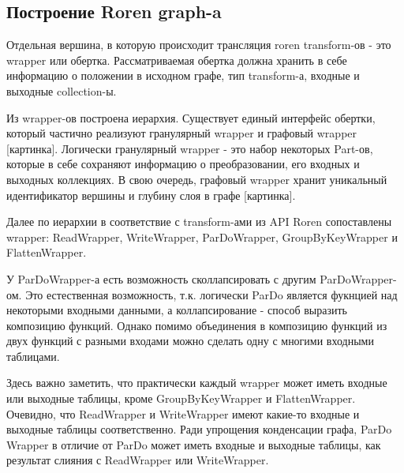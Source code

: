 \subsection{Построение Roren graph-a}

Отдельная вершина, в которую происходит трансляция roren transform-ов - это wrapper или обертка. Рассматриваемая обертка должна хранить в себе информацию о положении в исходном графе, тип transform-а, входные и выходные collection-ы.

Из wrapper-ов построена иерархия. Существует единый интерфейс обертки, который частично реализуют гранулярный wrapper и графовый wrapper [картинка]. Логически гранулярный wrapper - это набор некоторых Part-ов, которые в себе сохраняют информацию о преобразовании, его входных и выходных коллекциях. В свою очередь, графовый wrapper хранит уникальный идентификатор вершины и глубину слоя в графе [картинка].

Далее по иерархии в соответствие с transform-ами из API Roren сопоставлены wrapper: ReadWrapper, WriteWrapper, ParDoWrapper, GroupByKeyWrapper и FlattenWrapper.

У ParDoWrapper-а есть возможность сколлапсировать с другим ParDoWrapper-ом. Это естественная возможность, т.к. логически ParDo является фукнцией над некоторыми входными данными, а коллапсирование - способ выразить композицию функций. Однако помимо объединения в композицию функций из двух функций с разными входами можно сделать одну с многими входными таблицами.

Здесь важно заметить, что практически каждый wrapper может иметь входные или выходные таблицы, кроме GroupByKeyWrapper и FlattenWrapper. Очевидно, что ReadWrapper и WriteWrapper имеют какие-то входные и выходные таблицы соответственно. Ради упрощения конденсации графа, ParDo Wrapper в отличие от ParDo может иметь входные и выходные таблицы, как результат слияния с ReadWrapper или WriteWrapper.
